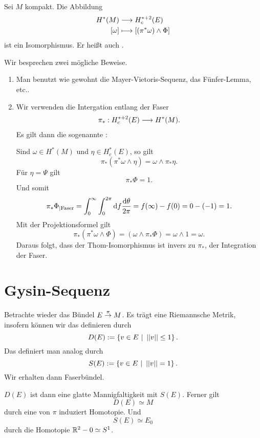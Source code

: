 Sei $M$ kompakt. Die Abbildung
\begin{align*}
H^*(M) & \overset{}{\longrightarrow} H^{*+2}_c(E)\\
[\omega] & \longmapsto [(\pi^*\omega) \wedge \Phi ]
\end{align*}
ist ein Isomorphismus. Er heißt auch .
\begin{Beweis}{}
Wir besprechen zwei mögliche Beweise.
\begin{enumerate}[1.]
	\item Man benutzt wie gewohnt die Mayer-Vietoris-Sequenz, das Fünfer-Lemma, etc..
	\item Wir verwenden die Intergation entlang der Faser
	\begin{align*}
\pi_* : H^{* + 2}_c (E )  \overset{}{\longrightarrow} H^*(M).
\end{align*}
	Es gilt dann die sogenannte :
	
	Sind $\omega \in H^*(M)$ und $\eta \in H^*_c(E)$, so gilt
	\[ \pi_*(\pi^* \omega \wedge \eta) = \omega \wedge \pi_*\eta.\]
	Für $\eta = \Psi$ gilt
	\[ \pi_*\Phi = 1. \]
	Und somit
	\[ 
	\pi_*\Phi_{|\text{Faser}} = \int_{0}^\infty \int_{0}^{2\pi} \text{d} f \frac{\text{d} \theta}{2\pi} = f(\infty) - f(0) = 0 - (-1) = 1.
	 \]
	 Mit der Projektionsformel gilt
	 \[ \pi_*(\pi^* \omega \wedge \Phi) = (\omega\wedge \pi_* \Phi) = \omega \wedge 1 = \omega. \]
	Daraus folgt, dass der Thom-Isomorphismus ist invers zu $\pi_*$, der Integration der Faser.
\end{enumerate}
\end{Beweis}

\section{Gysin-Sequenz}
Betrachte wieder das Bündel $E \overset{\pi}{\rightarrow} M$. Es trägt eine Riemannsche Metrik, insofern können wir das  definieren durch
\[ D(E) := \set{v \in E}{\norm{v} \leq 1}. \]
Das  definiert man analog durch
\[ S(E) := \set{v \in E}{\norm{v} = 1}. \]
Wir erhalten dann Faserbündel.
\begin{center}
\end{center}
$D(E)$ ist dann eine glatte Mannigfaltigkeit mit $S(E)$. Ferner gilt
\[ D(E) \simeq M \]
durch eine von $\pi$ induziert Homotopie. Und
\[ S(E) \simeq E_0 \]
durch die Homotopie $\mathbb{R}^2 - 0 \simeq S^1$.

